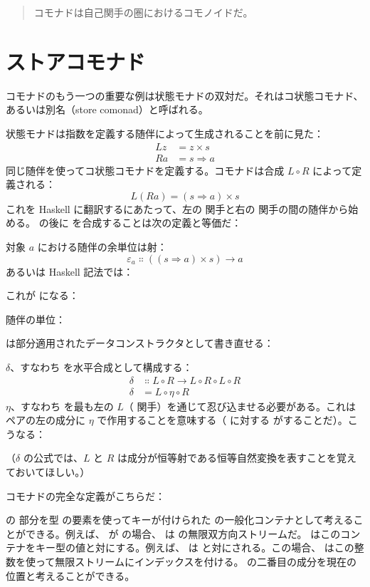 \begin{quote}
  コモナドは自己関手の圏におけるコモノイドだ。
\end{quote}

\section{ストアコモナド}

コモナドのもう一つの重要な例は状態モナドの双対だ。それはコ状態コモナド、あるいは別名（store comonad）と呼ばれる。

状態モナドは指数を定義する随伴によって生成されることを前に見た：
\begin{align*}
  L z & = z\times{}s      \\
  R a & = s \Rightarrow a
\end{align*}
同じ随伴を使ってコ状態コモナドを定義する。コモナドは合成 $L \circ R$ によって定義される：
\[L (R a) = (s \Rightarrow a)\times{}s\]
これを Haskell に翻訳するにあたって、左の  関手と右の  関手の間の随伴から始める。 の後に  を合成することは次の定義と等価だ：

対象 $a$ における随伴の余単位は射：
\[\varepsilon_a \Colon ((s \Rightarrow a)\times{}s) \to a\]
あるいは Haskell 記法では：

これが  になる：

随伴の単位：

は部分適用されたデータコンストラクタとして書き直せる：

$\delta$、すなわち  を水平合成として構成する：
\begin{align*}
  \delta & \Colon L \circ R \to L \circ R \circ L \circ R \\
  \delta & = L \circ \eta \circ R
\end{align*}
$\eta$、すなわち  を最も左の $L$（ 関手）を通じて忍び込ませる必要がある。これはペアの左の成分に $\eta$ で作用することを意味する（ に対する  がすることだ）。こうなる：

（$\delta$ の公式では、$L$ と $R$ は成分が恒等射である恒等自然変換を表すことを覚えておいてほしい。）

 コモナドの完全な定義がこちらだ：

 の  部分を型  の要素を使ってキーが付けられた  の一般化コンテナとして考えることができる。例えば、 が  の場合、 は  の無限双方向ストリームだ。 はこのコンテナをキー型の値と対にする。例えば、 は  と対にされる。この場合、 はこの整数を使って無限ストリームにインデックスを付ける。 の二番目の成分を現在の位置と考えることができる。

